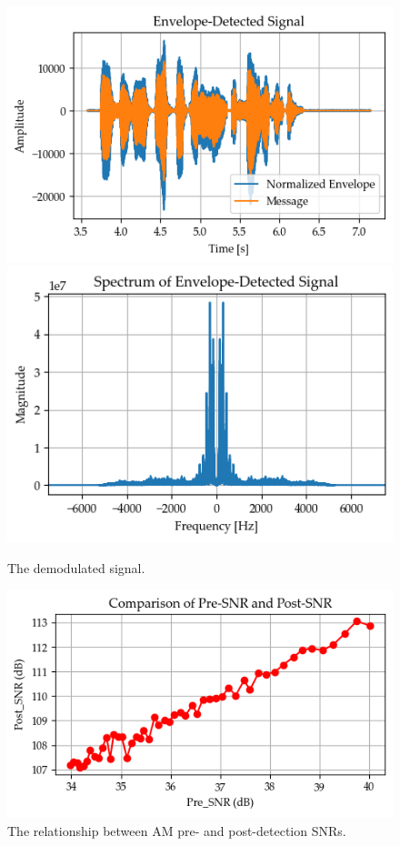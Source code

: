 \documentclass[../ECE459FinalProjectReport.tex]{subfiles}
\begin{document}
\begin{figure}[b]
    \centering
    \includegraphics[width=0.49\linewidth]{plots/am/detected_time.png}
    \includegraphics[width=0.49\linewidth]{plots/am/detected_spectrum.png}
    \caption{The demodulated signal.}
    \label{fig:am-demodulated}
\end{figure}
\begin{figure}[b]
    \centering
    \includegraphics[width=0.6\linewidth]{plots/am/am_snr_relation.png}
    \caption{The relationship between AM pre- and post-detection SNRs.}
    \label{fig:am-snr-relation}
\end{figure}
\end{document}
